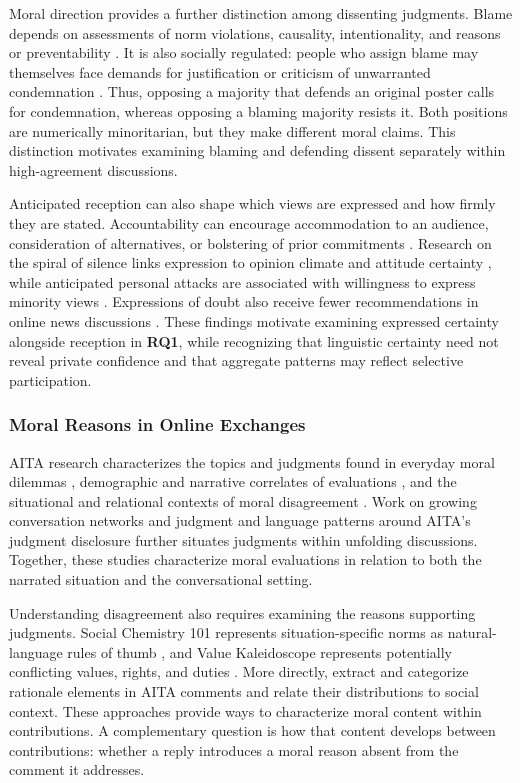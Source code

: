 Moral direction provides a further distinction among dissenting
judgments. Blame depends on assessments of norm violations, causality,
intentionality, and reasons or preventability \cite{malle2014blame}.
It is also socially regulated: people who assign blame may themselves
face demands for justification or criticism of unwarranted condemnation
\cite{malle2022socially}. Thus, opposing a majority that defends an original
poster calls for condemnation, whereas opposing a blaming majority
resists it. Both positions are numerically minoritarian, but they make
different moral claims. This distinction motivates examining blaming and
defending dissent separately within high-agreement discussions.

Anticipated reception can also shape which views are expressed and how
firmly they are stated. Accountability can encourage accommodation to an
audience, consideration of alternatives, or bolstering of prior
commitments \cite{tetlock1989strategies}. Research on the spiral of silence
links expression to opinion climate and attitude certainty
\cite{matthes2010spiral}, while anticipated personal attacks are associated
with willingness to express minority views \cite{neubaum2018sanctions}.
Expressions of doubt also receive fewer recommendations in online news
discussions \cite{evans2023doubt}. These findings motivate examining
expressed certainty alongside reception in \textbf{RQ1}, while recognizing
that linguistic certainty need not reveal private confidence and that
aggregate patterns may reflect selective participation.

\subsubsection*{Moral Reasons in Online Exchanges}
AITA research characterizes the topics and judgments found in everyday
moral dilemmas \cite{nguyen2022mapping,yudkin2025large}, demographic and
narrative correlates of evaluations
\cite{decandia2022socialnorms,giorgi2023author}, and the situational and
relational contexts of moral disagreement \cite{shi2025moral}. Work on
growing conversation networks \cite{goglia2024structure} and judgment and
language patterns around AITA's judgment disclosure
\cite{goglia2026influence} further situates judgments within unfolding
discussions. Together, these studies characterize moral evaluations in
relation to both the narrated situation and the conversational setting.

Understanding disagreement also requires examining the reasons supporting
judgments. Social Chemistry 101 represents situation-specific norms as
natural-language rules of thumb \cite{forbes2020social}, and Value
Kaleidoscope represents potentially conflicting values, rights, and duties
\cite{sorensen2024value}. More directly, \citet{xi2024morality} extract and
categorize rationale elements in AITA comments and relate their
distributions to social context. These approaches provide ways to
characterize moral content within contributions. A complementary question
is how that content develops between contributions: whether a reply
introduces a moral reason absent from the comment it addresses.

